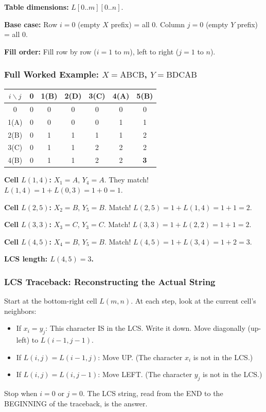 \documentclass[12pt,portrait]{article}
\begin{document}
\begin{rulebox}
\textbf{Table dimensions:} $L[0..m][0..n]$.

\textbf{Base case:} Row $i=0$ (empty $X$ prefix) = all 0. Column $j=0$ (empty $Y$ prefix) = all 0.

\textbf{Fill order:} Fill row by row ($i = 1$ to $m$), left to right ($j = 1$ to $n$).
\end{rulebox}

\subsubsection{Full Worked Example: $X = \text{ABCB}$, $Y = \text{BDCAB}$}

\begin{center}
\begin{tabular}{c|c|c|c|c|c|c}
\toprule
$i \backslash j$ & 0 & 1(B) & 2(D) & 3(C) & 4(A) & 5(B) \\
\midrule
0 & 0 & 0 & 0 & 0 & 0 & 0 \\
1(A) & 0 & 0 & 0 & 0 & 1 & 1 \\
2(B) & 0 & 1 & 1 & 1 & 1 & 2 \\
3(C) & 0 & 1 & 1 & 2 & 2 & 2 \\
4(B) & 0 & 1 & 1 & 2 & 2 & \textbf{3} \\
\bottomrule
\end{tabular}
\end{center}

\textbf{Cell $L(1,4)$:} $X_1=A$, $Y_4=A$. They match! $L(1,4) = 1 + L(0,3) = 1 + 0 = 1$.

\textbf{Cell $L(2,5)$:} $X_2=B$, $Y_5=B$. Match! $L(2,5) = 1 + L(1,4) = 1 + 1 = 2$.

\textbf{Cell $L(3,3)$:} $X_3=C$, $Y_3=C$. Match! $L(3,3) = 1 + L(2,2) = 1 + 1 = 2$.

\textbf{Cell $L(4,5)$:} $X_4=B$, $Y_5=B$. Match! $L(4,5) = 1 + L(3,4) = 1 + 2 = 3$.

\textbf{LCS length: $L(4,5) = 3$.}

\subsubsection{LCS Traceback: Reconstructing the Actual String}

\begin{rulebox}
Start at the bottom-right cell $L(m,n)$. At each step, look at the current cell's neighbors:
\begin{itemize}[leftmargin=*]
    \item If $x_i = y_j$: This character IS in the LCS. Write it down. Move diagonally (up-left) to $L(i-1, j-1)$.
    \item If $L(i,j) = L(i-1,j)$: Move UP. (The character $x_i$ is not in the LCS.)
    \item If $L(i,j) = L(i,j-1)$: Move LEFT. (The character $y_j$ is not in the LCS.)
\end{itemize}
Stop when $i=0$ or $j=0$. The LCS string, read from the END to the BEGINNING of the traceback, is the answer.
\end{rulebox}
\end{document}
